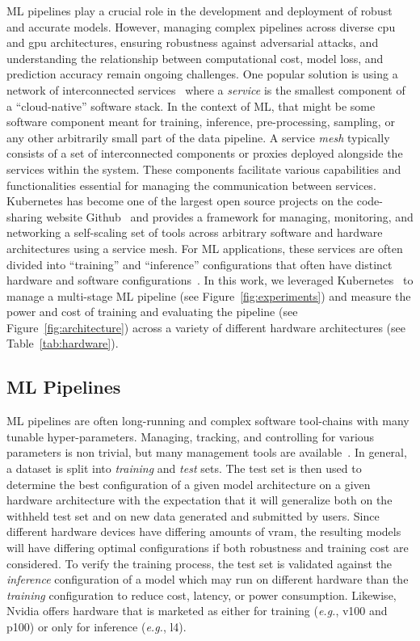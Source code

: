 \documentclass[sn-mathphys-num]{sn-jnl}%
\begin{document}
ML pipelines play a crucial role in the development and deployment of robust and accurate models. However, managing complex pipelines across diverse \acrfull{cpu} and \acrfull{gpu}  architectures, ensuring robustness against adversarial attacks, and understanding the relationship between computational cost, model loss, and prediction accuracy remain ongoing challenges.
One popular solution is using a network of interconnected services~\cite{panchal2024reusable,hasselbring2017microservice,zhou2022online,singh2023load} where a \textit{service} is the smallest component of a ``cloud-native'' software stack. In the context of ML, that might be some software component meant for training, inference, pre-processing, sampling, or any other arbitrarily small part of the data pipeline.
A service \textit{mesh} typically consists of a set of interconnected components or proxies deployed alongside the services within the system.  These components facilitate various capabilities and functionalities essential for managing the communication between services. Kubernetes has become one of the largest open source projects on the code-sharing website Github~\cite{k8s-size} and provides a framework for managing, monitoring, and networking a self-scaling set of tools across arbitrary software and hardware architectures using a service mesh. For ML applications, these services are often divided into ``training'' and ``inference'' configurations that often have distinct hardware and software configurations~\cite{wang2019benchmarking}. In this work, we leveraged Kubernetes~\cite{k8s} to manage a multi-stage ML pipeline (see Figure~\ref{fig:experiments}) and measure the power and cost of training and evaluating the pipeline (see Figure~\ref{fig:architecture}) across a variety of different hardware architectures (see Table~\ref{tab:hardware}).


\subsection{ML Pipelines}
\label{ml_pipelines}
ML pipelines are often long-running and complex software tool-chains with many tunable hyper-parameters.
Managing, tracking, and controlling for various parameters is non trivial, but many management tools are available~\cite{dvc,hydra,k8s}.
In general, a dataset is split into \textit{training} and \textit{test} sets.
The test set is then used to determine the best configuration of a given model architecture on a given hardware architecture with the expectation that it will generalize both on the withheld test set and on new data generated and submitted by users.
Since different hardware devices have differing amounts of \acrfull{vram}, the resulting models will have differing optimal configurations if both robustness and training cost are considered.
To verify the training process, the test set is validated against the \textit{inference} configuration of a model which may run on different hardware than the \textit{training} configuration to reduce cost, latency, or power consumption. Likewise, Nvidia offers hardware that is marketed as either for training (\textit{e.g.}, v100 and p100) or only for inference (\textit{e.g.}, l4).
\end{document}
